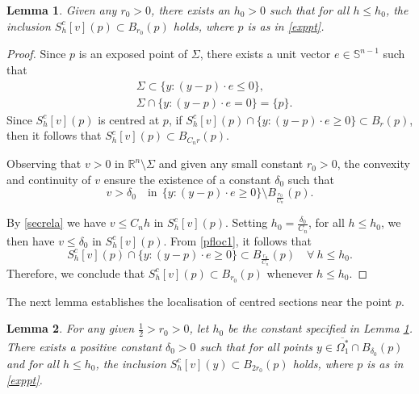 \documentclass[10pt,a4paper]{amsart}
\theoremstyle{plain}
\newtheorem{lemma}{Lemma}[section]
\newcommand{\0}{\textbf{0}}
\numberwithin{equation}{section}
\numberwithin{equation}{section}
\numberwithin{figure}{section}
\begin{document}
\begin{lemma}\label{locc1}
Given any \( r_0 > 0 \), there exists an \( h_0 > 0 \) such that for all \( h \leq h_0 \), the inclusion \( S^c_h[v](p) \subset B_{r_0}(p) \) holds,  where $p$ is as in \eqref{exppt}. 
\end{lemma}

\begin{proof}
Since \( p \) is an exposed point of \( \Sigma \), there exists a unit vector $e\in\mathbb{S}^{n-1}$ such that 
	\begin{align*} 
		& \Sigma \subset \{ y : (y - p) \cdot e \leq 0 \}, \\
		& \Sigma \cap \{ y : (y - p) \cdot e = 0 \} = \{ p \}.
	\end{align*} 
Since $S^c_h[v](p)$ is centred at $p$, if $S^c_h[v](p) \cap \{ y : (y - p) \cdot e \geq 0 \} \subset B_r(p) $, then it follows that $S^c_h[v](p) \subset B_{C_n r}(p)$.

Observing that \( v > 0 \) in \( \mathbb{R}^n \setminus \Sigma \) and given any small constant \( r_0>0 \), the convexity and continuity of \( v \) ensure the existence of a constant \( \delta_0 \) such that
\begin{equation}\label{pfloc1}
v > \delta_0 \quad \text{in} \ \ \{ y : (y - p) \cdot e \geq 0 \} \setminus B_{\frac{r_0}{C_n}}(p).
\end{equation}

By \eqref{secrela} we have $v \leq C_n h$ in $S^c_h[v](p)$. Setting \( h_0 = \frac{\delta_0}{C_n} \), for all \( h \leq h_0 \), we then have \( v \leq \delta_0 \) in \( S^c_h[v](p) \). From \eqref{pfloc1}, it follows that
\[ S^c_h[v](p) \cap \{ y : (y - p) \cdot e \geq 0 \} \subset B_{\frac{r_0}{C_n}}(p) \quad \forall\ h \leq h_0. \]
Therefore, we conclude that \( S^c_h[v](p) \subset B_{r_0}(p) \) whenever \( h \leq h_0 \).
\end{proof}


The next lemma establishes the localisation of centred sections near the point $p$. 

\begin{lemma}\label{locc2}
For any given \( \frac{1}{2} > r_0 > 0 \), let \( h_0 \) be the constant specified in Lemma \ref{locc1}. There exists a positive constant \( \delta_0 > 0 \) such that for all points \( y \in \overline{\Omega_1^*} \cap B_{\delta_0}(p) \) and for all \( h \leq h_0 \), the inclusion \( S_h^c[v](y) \subset B_{2r_0}(p) \) holds,  where $p$ is as in \eqref{exppt}. 
\end{lemma}
\end{document}
